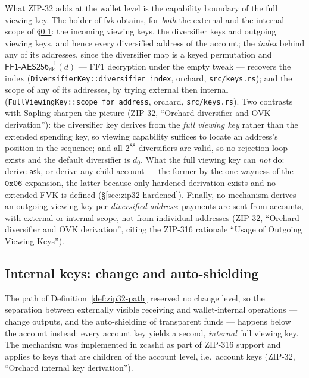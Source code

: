 \documentclass[11pt,a4paper]{article}
\theoremstyle{definition}
\newcommand{\ask}{\ensuremath{\mathsf{ask}}}
\newcommand{\fvk}{\ensuremath{\mathsf{fvk}}}
\newcommand{\dk}{\ensuremath{\mathsf{dk}}}
\begin{document}
What ZIP-32 adds at the wallet level is the capability boundary of the full
viewing key. The holder of $\fvk$ obtains, for \emph{both} the external and
the internal scope of \S\ref{sec:zip32-internal}: the incoming viewing keys,
the diversifier keys and outgoing viewing keys, and hence every diversified
address of the account; the \emph{index} behind any of its addresses,
since the diversifier map is a keyed permutation and
$\mathsf{FF1\text{-}AES256}^{-1}_{\dk}(d)$ --- FF1
decryption under the empty tweak --- recovers the index
(\texttt{DiversifierKey::diversifier\_index}, \textsf{orchard},
\texttt{src/keys.rs}); and the scope of any of its
addresses, by trying external then internal
(\texttt{FullViewingKey::scope\_for\_address}, \textsf{orchard},
\texttt{src/keys.rs}). Two contrasts with Sapling sharpen the picture
(ZIP-32, ``Orchard diversifier and OVK derivation''): the diversifier key
derives from the \emph{full viewing key} rather than the extended spending
key, so viewing capability suffices to locate an address's position in the
sequence; and all $2^{88}$ diversifiers are valid, so no rejection loop
exists and the default diversifier is $d_0$. What the full viewing key can
\emph{not} do: derive $\ask$, or derive any child account --- the former by
the one-wayness of the $\mathtt{0x06}$ expansion, the latter because only
hardened derivation exists and no extended FVK is defined
(\S\ref{sec:zip32-hardened}). Finally, no mechanism derives an outgoing
viewing key per \emph{diversified address}: payments are sent from accounts,
with external or internal scope, not from individual addresses (ZIP-32,
``Orchard diversifier and OVK derivation'', citing the ZIP-316 rationale
``Usage of Outgoing Viewing Keys'').

\subsection{Internal keys: change and auto-shielding}\label{sec:zip32-internal}

The path of Definition~\ref{def:zip32-path} reserved no change level, so
the separation between externally visible receiving and wallet-internal
operations --- change outputs, and the auto-shielding of transparent funds
--- happens below the account instead: every account key yields a second,
\emph{internal} full viewing key. The mechanism was implemented in
\textsf{zcashd} as part of ZIP-316 support and applies to keys that are
children of the account level, i.e.\ account keys (ZIP-32, ``Orchard
internal key derivation'').
\end{document}
